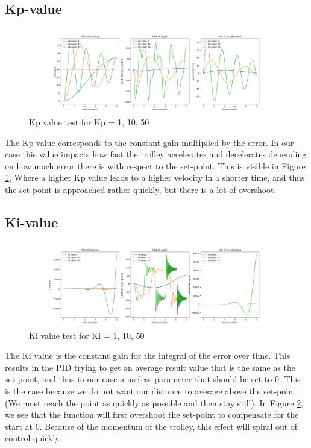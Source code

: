 \documentclass{article}
\begin{document}
\subsection{Kp-value}
\begin{figure}[h]
    \centering
    \includegraphics[width=1\linewidth]{graphs/kp_test.png}
    \caption{Kp value test for Kp = 1, 10, 50}
    \label{fig:kp-test}
\end{figure}
The Kp value corresponds to the constant gain multiplied by the error. In our case this value impacts how fast the trolley accelerates and decelerates depending on how much error there is with respect to the set-point.
This is visible in Figure \ref{fig:kp-test}, Where a higher Kp value leads to a higher velocity in a shorter time, and thus the set-point is approached rather quickly, but there is a lot of overshoot.

\subsection{Ki-value}
\begin{figure}[h]
    \centering
    \includegraphics[width=1\linewidth]{graphs/ki_test.png}
    \caption{Ki value test for Ki = 1, 10, 50}
    \label{fig:ki-test}
\end{figure}

The Ki value is the constant gain for the integral of the error over time. This results in the PID trying to get an average result value that is the same as the set-point,
and thus in our case a useless parameter that should be set to 0. This is the case because we do not want our distance to average above the set-point (We must reach the point as quickly as possible and then stay still). In Figure \ref{fig:ki-test}, we see that the function will first overshoot the set-point to compensate for the start at 0. Because of the momentum of the trolley, this effect will spiral out of control quickly.
\end{document}
